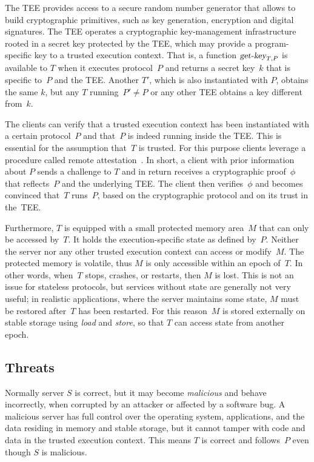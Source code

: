 \documentclass[11pt]{article}
\theoremstyle{plain-boldhead}
\theoremstyle{definition-boldhead}
\newcommand{\op}[1]{\textsl{#1}}
\begin{document}
The TEE provides access to a secure random number generator that allows to
build cryptographic primitives, such as key generation, encryption and digital
signatures.
% 
The TEE operates a cryptographic key-management infrastructure rooted
in a secret key protected by the TEE, which may
provide a program-specific key to a trusted execution context.
That is, a function $\op{get-key}_{T,P}$ is available to $T$ when
it executes protocol~$P$ and returns a secret key~$k$ that is specific
to~$P$ and the TEE.  Another $T'$, which is also instantiated with $P$, obtains the
same $k$, but any $T$ running~$P' \neq P$ or any other TEE 
obtains a key different from~$k$.

The clients can verify that a trusted execution context has been
instantiated with a certain protocol~$P$ and that~$P$ is indeed running
inside the TEE. This is essential for the assumption that~$T$ is trusted.
For this purpose clients leverage a procedure called remote
attestation~\cite{anati2013}.
% 
In short, a client with prior information about $P$ sends a challenge to
$T$ and in return receives a cryptographic proof~$\phi$ that reflects~$P$
and the underlying TEE.  The client then verifies~$\phi$ and becomes
convinced that~$T$ runs~$P$, based on the cryptographic protocol and on its
trust in the~TEE.

Furthermore, $T$ is equipped with a small protected memory area~$M$ that
can only be accessed by~$T$.  It holds the execution-specific state as
defined by~$P$. Neither the server nor any other trusted execution context
can access or modify~$M$.
% 
The protected memory is volatile, thus $M$ is only accessible within an
epoch of~$T$. In other words, when~$T$ stops, crashes, or restarts, then $M$
is lost.  This is not an issue for stateless protocols, but services
without state are generally not very useful; in realistic applications,
where the server maintains some state, $M$ must be restored after~$T$ has
been restarted.
% 
For this reason~$M$ is stored externally on stable storage using \op{load}
and \op{store}, so that $T$ can access state from another epoch.


\subsection{Threats}

Normally server $S$ is correct, but it may become \emph{malicious} and
behave incorrectly, when corrupted by an attacker or affected by a software
bug.  A malicious server has full control over the
operating system, applications, and the data residing in memory and
stable storage,
% 
but it cannot tamper with code and data in the trusted execution context.
This means $T$ is correct and follows~$P$ even though $S$ is malicious.
\end{document}
